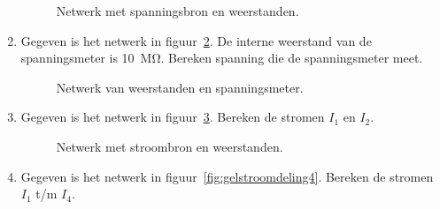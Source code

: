 \begin{enumerate}[labelindent=0pt,labelwidth=\widthof{8.88.\ },label=\textbf{\thechapter.\arabic*.},leftmargin=!,ref=\thechapter.\arabic*]
\begin{figure}[!ht]
\centering
{}
\caption{Netwerk met spanningsbron en weerstanden.}
\label{fig:gelspanningsdeling1}
\end{figure}


\item
\label{gel:spanningsdeling1}
Gegeven is het netwerk in figuur~\ref{fig:gelspanningsdeling2}. De interne weerstand van de spanningsmeter is \SI{10}{\mega\ohm}. Bereken spanning die de spanningsmeter meet.

\begin{figure}[!ht]
\centering
{}
\caption{Netwerk van weerstanden en spanningsmeter.}
\label{fig:gelspanningsdeling2}
\end{figure}


\item
\label{que:gelstroomdeling3}
Gegeven is het netwerk in figuur~\ref{fig:gelstroomdeling3}. Bereken de stromen $I_1$ en $I_2$.

\begin{figure}[!ht]
\centering
{}
\caption{Netwerk met stroombron en weerstanden.}
\label{fig:gelstroomdeling3}
\end{figure}


\item
\label{que:gelstroomdeling4}
Gegeven is het netwerk in figuur~\ref{fig:gelstroomdeling4}. Bereken de stromen $I_1$ t/m $I_4$.


\end{enumerate}
